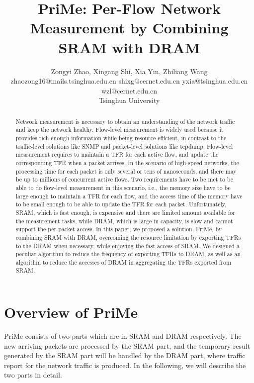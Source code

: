 \documentclass[10pt, conference, letterpaper]{IEEEtran}
\begin{document}
\title{PriMe: Per-Flow Network Measurement by Combining SRAM with DRAM}
\author{Zongyi Zhao, Xingang Shi, Xia Yin, Zhiliang Wang\\ zhaozong16@mails.tsinghua.edu.cn shixg@cernet.edu.cn yxia@tsinghua.edu.cn wzl@cernet.edu.cn\\ 
	Tsinghua University}
\maketitle
\begin{abstract}
Network measurement is necessary to obtain an understanding of the network traffic and keep the network healthy. Flow-level measurement is widely used because it provides rich enough information while being resource efficient, in contrast to the traffic-level solutions like SNMP and packet-level solutions like tcpdump. Flow-level measurement requires to maintain a TFR for each active flow, and update the corresponding TFR when a packet arrives. In the scenario of high-speed networks, the processing time for each packet is only several or tens of nanoseconds, and there may be up to millions of concurrent active flows. Two requirements have to be met to be able to do flow-level measurement in this scenario, i.e., the memory size have to be large enough to maintain a TFR for each flow, and the access time of the memory have to be small enough to be able to update the TFR for each packet. Unfortunately, SRAM, which is fast enough, is expensive and there are limited amount available for the measurement tasks, while DRAM, which is large in capacity, is slow and cannot support the per-packet access. In this paper, we proposed a solution, PriMe, by combining SRAM with DRAM, overcoming the resource limitation by exporting TFRs to the DRAM when necessary, while enjoying the fast access of SRAM. We designed a peculiar algorithm to reduce the frequency of exporting TFRs to DRAM, as well as an algorithm to reduce the accesses of DRAM in aggregating the TFRs exported from SRAM. 
\end{abstract}
\section{Overview of PriMe}
PriMe consists of two parts which are in SRAM and DRAM respectively. The new arriving packets are processed by the SRAM part, and the temporary result generated by the SRAM part will be handled by the DRAM part, where traffic report for the network traffic is produced. In the following, we will describe the two parts in detail.
\end{document}
